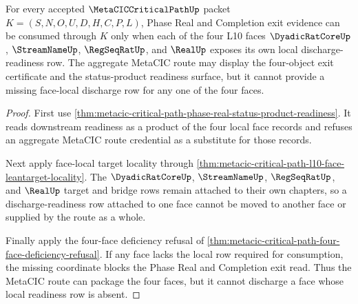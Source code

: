 \begin{theorem}
\label{thm:metacic-critical-path-l10-four-face-discharge-readiness}
For every accepted $\MetaCICCriticalPathUp$ packet $K=(S,N,O,U,D,H,C,P,L)$, Phase Real and Completion exit evidence can be consumed through $K$ only when each of the four L10 faces $\DyadicRatCoreUp$, $\StreamNameUp$, $\RegSeqRatUp$, and $\RealUp$ exposes its own local discharge-readiness row. The aggregate MetaCIC route may display the four-object exit certificate and the status-product readiness surface, but it cannot provide a missing face-local discharge row for any one of the four faces.
\end{theorem}
\begin{proof}
First use \autoref{thm:metacic-critical-path-phase-real-status-product-readiness}. It reads downstream readiness as a product of the four local face records and refuses an aggregate MetaCIC route credential as a substitute for those records.

Next apply face-local target locality through \autoref{thm:metacic-critical-path-l10-face-leantarget-locality}. The $\DyadicRatCoreUp$, $\StreamNameUp$, $\RegSeqRatUp$, and $\RealUp$ target and bridge rows remain attached to their own chapters, so a discharge-readiness row attached to one face cannot be moved to another face or supplied by the route as a whole.

Finally apply the four-face deficiency refusal of \autoref{thm:metacic-critical-path-four-face-deficiency-refusal}. If any face lacks the local row required for consumption, the missing coordinate blocks the Phase Real and Completion exit read. Thus the MetaCIC route can package the four faces, but it cannot discharge a face whose local readiness row is absent.
\end{proof}


